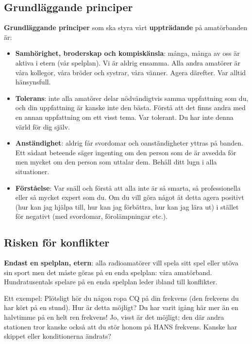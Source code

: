 \subsection{Grundläggande principer}
\textbf{Grundläggande principer} som ska styra vårt \textbf{uppträdande} på
amatörbanden är:

\begin{itemize}
\item \textbf{Samhörighet, broderskap och kompiskänsla}: många, många av oss
  är aktiva i etern (vår spelplan).
  Vi är aldrig ensamma.
  Alla andra amatörer är våra kollegor, våra bröder och systrar, våra vänner.
  Agera därefter.
  Var alltid hänsynsfull.

\item \textbf{Tolerans}: inte alla amatörer delar nödvändigtvis samma
  uppfattning som du, och din uppfattning är kanske inte den bästa.
  Förstå att det finns andra med en annan uppfattning om ett visst tema.
  Var tolerant.
  Du har inte denna värld för dig själv.

\item \textbf{Anständighet}: aldrig får svordomar och oanständigheter yttras
  på banden.
  Ett sådant beteende säger ingenting om den person som de är avsedda för men
  mycket om den person som uttalar dem.
  Behåll ditt lugn i alla situationer.

\item \textbf{Förståelse}: Var snäll och förstå att alla inte är så smarta,
  så professionella eller så mycket expert som du.
  Om du vill göra något åt detta agera positivt (hur kan jag hjälpa till,
  hur kan jag förbättra, hur kan jag lära ut) i stället för negativt
  (med svordomar, förolämpningar etc.).
\end{itemize}

\subsection{Risken för konflikter}
\textbf{Endast en spelplan, etern}: alla radioamatörer vill spela sitt spel
eller utöva sin sport men det måste göras på en enda spelplan: våra amatörband.
Hundratusentals spelare på en enda spelplan leder ibland till konflikter.

Ett exempel: Plötsligt hör du någon ropa CQ på din frekvens (den frekvens du
har kört på en stund).
Hur är detta möjligt?
Du har varit igång här mer än en halvtimme på en helt ren frekvens!
Jo, visst är det möjligt; den där andra stationen tror kanske också att du stör
honom på HANS frekvens.
Kanske har skippet eller konditionerna ändrats?


